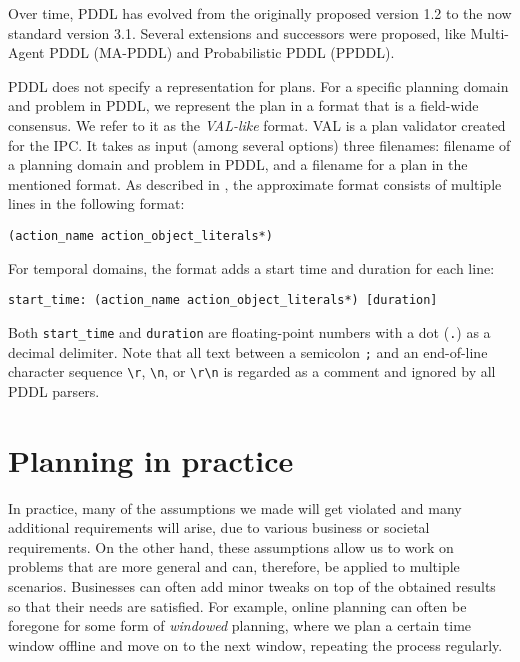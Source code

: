 Over time, PDDL has evolved from the originally proposed version 1.2
to the now standard version 3.1. Several extensions and successors were proposed,
like Multi-Agent PDDL
(MA-PDDL) and
Probabilistic PDDL
(PPDDL).

PDDL does not specify a representation for plans. For a specific planning domain and problem in PDDL,
we represent the plan in a format that is a field-wide consensus. We refer to it
as the \textit{VAL-like} format. VAL \citep{Howey2003} is a plan validator created for the IPC.
It takes as input (among several options) three filenames: filename of a planning domain and
problem in PDDL, and a filename for a plan in the mentioned format.
As described in \citet[Figure~2]{Howey2003}, the approximate format
consists of multiple lines in the following format:
\begin{center}
\verb+(action_name action_object_literals*)+
\end{center}
For temporal domains, the format adds a start time and duration for each line:
\begin{center}
\verb+start_time: (action_name action_object_literals*) [duration]+
\end{center}
Both \verb+start_time+ and \verb+duration+ are floating-point numbers with a dot
(\verb+.+) as a decimal delimiter.
Note that all text between a semicolon \verb+;+ and an end-of-line character sequence \verb+\r+, \verb+\n+, or \verb+\r\n+ is regarded as a comment and ignored by all PDDL parsers.







\section{Planning in practice}

In practice, many of the assumptions we made will get violated and many additional requirements will arise,
due to various business or societal requirements.
On the other hand, these assumptions allow us to work
on problems that are more general and can, therefore, be applied to multiple scenarios.
Businesses can often add minor tweaks on top of the obtained results so that
their needs are satisfied. 
For example, online planning can often be foregone for some form of \textit{windowed} planning,
where we plan a certain time window offline and move on to the next window,
repeating the process regularly.

